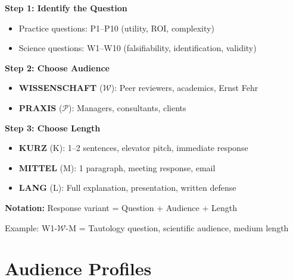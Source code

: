 \begin{tcolorbox}[colback=blue!5!white, colframe=blue!75!black,
    title=Response Selection Guide]

\textbf{Step 1: Identify the Question}
\begin{itemize}[nosep]
    \item Practice questions: P1--P10 (utility, ROI, complexity)
    \item Science questions: W1--W10 (falsifiability, identification, validity)
\end{itemize}

\textbf{Step 2: Choose Audience}
\begin{itemize}[nosep]
    \item \textbf{WISSENSCHAFT} ($\mathcal{W}$): Peer reviewers, academics, Ernst Fehr
    \item \textbf{PRAXIS} ($\mathcal{P}$): Managers, consultants, clients
\end{itemize}

\textbf{Step 3: Choose Length}
\begin{itemize}[nosep]
    \item \textbf{KURZ} (K): 1--2 sentences, elevator pitch, immediate response
    \item \textbf{MITTEL} (M): 1 paragraph, meeting response, email
    \item \textbf{LANG} (L): Full explanation, presentation, written defense
\end{itemize}

\textbf{Notation:} Response variant = Question + Audience + Length

Example: W1-$\mathcal{W}$-M = Tautology question, scientific audience, medium length

\end{tcolorbox}

\section{Audience Profiles}
\label{sec:da2-audiences}

